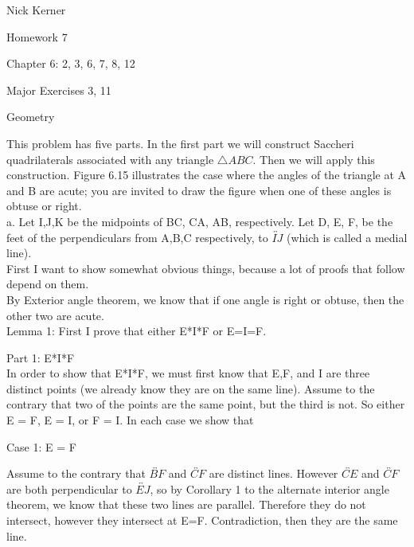 \documentclass[12pt,letterpaper]{article}
\newcommand{\Proof}{\noindent {\bf Proof: }}
\newcommand{\pro}[1]{\noindent {\bf #1}}
\begin{document}
\begin{flushright}
Nick Kerner

Homework 7

Chapter 6: 2, 3, 6, 7, 8, 12

Major Exercises 3, 11

\end{flushright}
\begin{center}
\large{Geometry}\\
\end{center}

\pro{2 }This problem has five parts.  In the first part we will construct Saccheri quadrilaterals associated with any triangle $\triangle ABC$.  Then we will apply this construction.  Figure 6.15 illustrates the case where the angles of the triangle at A and B are acute;  you are invited to draw the figure when one of these angles is obtuse or right.  \\


a. Let I,J,K be the midpoints of BC, CA, AB, respectively.  Let D, E, F, be the feet of the perpendiculars from A,B,C respectively, to $\overleftrightarrow{IJ}$ (which is called a medial line). \\ 


First I want to show somewhat obvious things, because a lot of proofs that follow depend on them.\\


By Exterior angle theorem, we know that if one angle is right or obtuse, then the other two are acute.\\



  

Lemma 1: First I prove that either E*I*F or E=I=F.

\Proof

\noindent Part 1: E*I*F\\

In order to show that E*I*F, we must first know that E,F, and I are three distinct points (we already know they are on the same line).  Assume to the contrary that two of the points are the same point, but the third is not.  So either E = F, E = I, or F = I. In each case we show that 

Case 1:  E = F
 
Assume to the contrary that $\overleftrightarrow{BF}$ and $\overleftrightarrow{CF}$ are distinct lines.  However $\overleftrightarrow{CE}$ and $\overleftrightarrow{CF}$ are both perpendicular to $\overleftrightarrow{EJ}$, so by Corollary 1 to the alternate interior angle theorem, we know that these two lines are parallel.  Therefore they do not intersect, however they intersect at E=F. Contradiction, then they are the same line.
\end{document}
